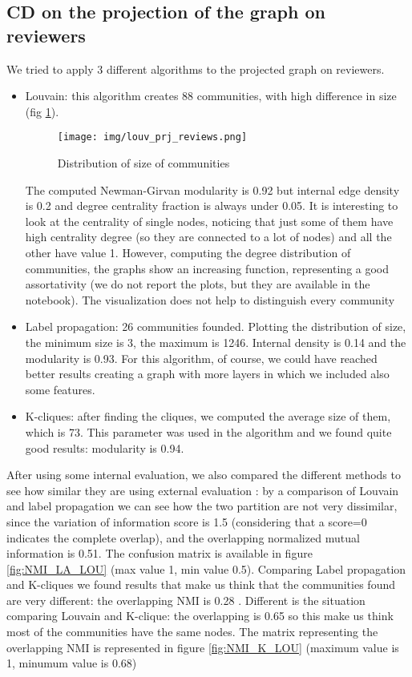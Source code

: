 \documentclass[sigchi]{acmart}
\begin{document}
\subsection{CD on the projection of the graph on reviewers}
We tried to apply 3 different algorithms to the projected graph on reviewers.\newline
\begin{itemize}

\item Louvain: this algorithm creates 88 communities, with high difference in size (fig \ref{size_d}).
\begin{figure}[h]
  \centering
  \texttt{[image: img/louv\_prj\_reviews.png]}
  \caption{Distribution of size of communities}
  \label{size_d}
\end{figure}
The computed Newman-Girvan modularity is 0.92 but internal edge density is 0.2 and degree centrality fraction is always under 0.05. It is interesting to look at the centrality of single nodes, noticing that just some of them have high centrality degree (so they are connected to a lot of nodes) and all the other have value 1. However, computing the degree distribution of communities, the graphs show an increasing function, representing a good assortativity (we do not report the plots, but they are available in the notebook). The visualization does not help to distinguish every community  \newline
\item Label propagation: 26 communities founded. Plotting the distribution of size, the minimum size is 3, the maximum is 1246. Internal density is 0.14 and the modularity is 0.93. For this algorithm, of course, we could have reached better results  creating a graph with more layers in which we included also some features.  \ \newline
\item K-cliques: after finding the cliques, we computed the average size of them, which is 73. This parameter was used in the algorithm and we found quite good results: modularity is 0.94. 
\end{itemize}

After using some internal evaluation, we also compared the different methods to see how similar they are using external evaluation : by a comparison of Louvain and label propagation we can see how the two partition are not very dissimilar, since the variation of information score is 1.5 (considering that a score=0 indicates the complete overlap), and the overlapping normalized mutual information is 0.51. The confusion matrix is available in figure \ref{fig:NMI_LA_LOU} (max value 1, min value 0.5). 
Comparing Label propagation and K-cliques we found results that make us think that the communities found are very different: the overlapping NMI is 0.28  .\newline
Different is the situation comparing Louvain and K-clique: the overlapping is 0.65 so this make us think most of the communities have the same nodes. The matrix representing the overlapping NMI is represented in figure \ref{fig:NMI_K_LOU} (maximum value is 1, minumum value is 0.68)
\end{document}
